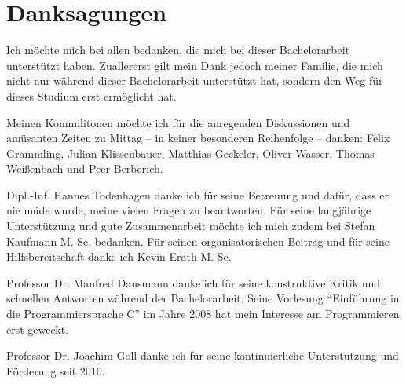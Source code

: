 
\chapter*{Danksagungen}

Ich möchte mich bei allen bedanken, die mich bei dieser Bachelorarbeit unterstützt haben.
Zuallererst gilt mein Dank jedoch meiner Familie, die mich nicht nur während dieser Bachelorarbeit unterstützt hat, sondern den Weg für dieses Studium erst ermöglicht hat.

Meinen Kommilitonen möchte ich für die anregenden Diskussionen und amüsanten Zeiten zu Mittag -- in keiner besonderen Reihenfolge -- danken:
Felix Grammling,
Julian Klissenbauer,
Matthias Geckeler,
Oliver Wasser,
Thomas Weißenbach und
Peer Berberich.



Dipl.-Inf. Hannes Todenhagen danke ich für seine Betreuung und dafür, dass er nie müde wurde, meine vielen Fragen zu beantworten.
Für seine langjährige Unterstützung und gute Zusammenarbeit möchte ich mich zudem bei Stefan Kaufmann M. Sc. bedanken.
Für seinen organisatorischen Beitrag und für seine Hilfsbereitschaft danke ich Kevin Erath M. Sc. 

Professor Dr. Manfred Dausmann danke ich für seine konstruktive Kritik und schnellen Antworten während der Bachelorarbeit. Seine Vorlesung \enquote{Einführung in die Programmiersprache C} im Jahre 2008 hat mein Interesse am Programmieren erst geweckt.

Professor Dr. Joachim Goll danke ich für seine kontinuierliche Unterstützung und Förderung seit 2010.
